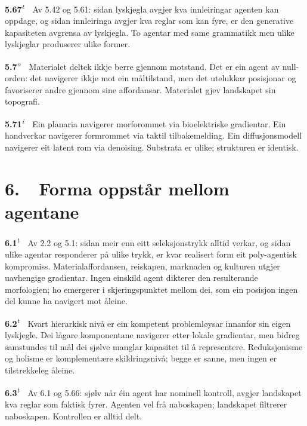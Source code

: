 \documentclass[10pt]{article}
\begin{document}
\noindent\textbf{5.67}\textsuperscript{\textit{t}}~~Av 5.42 og 5.61: sidan lyskjegla avgjer kva innleiringar agenten kan oppdage, og sidan innleiringa avgjer kva reglar som kan fyre, er den generative kapasiteten avgrensa av lyskjegla. To agentar med same grammatikk men ulike lyskjeglar produserer ulike former.




\noindent\textbf{5.7}\textsuperscript{\textit{o}}~~Materialet deltek ikkje berre gjennom motstand. Det er ein agent av null-orden: det navigerer ikkje mot ein måltilstand, men det utelukkar posisjonar og favoriserer andre gjennom sine affordansar. Materialet gjev landskapet sin topografi.




\noindent\textbf{5.71}\textsuperscript{\textit{i}}~~Ein planaria navigerer morforommet via bioelektriske gradientar. Ein handverkar navigerer formrommet via taktil tilbakemelding. Ein diffusjonsmodell navigerer eit latent rom via denoising. Substrata er ulike; strukturen er identisk.







\chapter*{6.~~Forma oppstår mellom agentane}




\noindent\textbf{6.1}\textsuperscript{\textit{t}}~~Av 2.2 og 5.1: sidan meir enn eitt seleksjonstrykk alltid verkar, og sidan ulike agentar responderer på ulike trykk, er kvar realisert form eit poly-agentisk kompromiss. Materialaffordansen, reiskapen, marknaden og kulturen utgjer uavhengige gradientar. Ingen einskild agent dikterer den resulterande morfologien; ho emergerer i skjeringspunktet mellom dei, som ein posisjon ingen del kunne ha navigert mot åleine.




\noindent\textbf{6.2}\textsuperscript{\textit{t}}~~Kvart hierarkisk nivå er ein kompetent problemløysar innanfor sin eigen lyskjegle. Dei lågare komponentane navigerer etter lokale gradientar, men bidreg samstundes til mål dei sjølve manglar kapasitet til å representere. Reduksjonisme og holisme er komplementære skildringsnivå; begge er sanne, men ingen er tilstrekkeleg åleine.




\noindent\textbf{6.3}\textsuperscript{\textit{t}}~~Av 6.1 og 5.66: sjølv når éin agent har nominell kontroll, avgjer landskapet kva reglar som faktisk fyrer. Agenten vel frå naboskapen; landskapet filtrerer naboskapen. Kontrollen er alltid delt.
\end{document}
